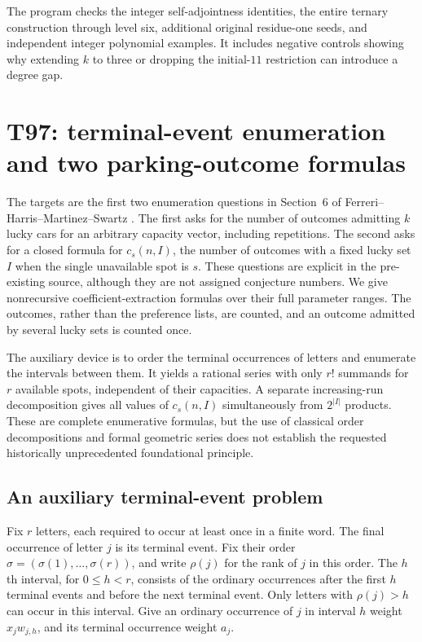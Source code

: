 \documentclass[11pt,a4paper]{article}
\theoremstyle{definition}
\theoremstyle{remark}
\begin{document}
The program  checks the integer self-adjointness
identities, the entire ternary construction through level six, additional
original residue-one seeds, and independent integer polynomial examples.
It includes negative controls showing why extending $k$ to three or
dropping the initial-$11$ restriction can introduce a degree gap.

\clearpage
\section{T97: terminal-event enumeration and two parking-outcome formulas}
\label{sec:t97parking}

The targets are the first two enumeration questions in Section~6 of
Ferreri--Harris--Martinez--Swartz \cite{t97fhms}. The first asks for the
number of outcomes admitting $k$ lucky cars for an arbitrary capacity
vector, including repetitions. The second asks for a closed formula for
$c_s(n,I)$, the number of outcomes with a fixed lucky set $I$ when the
single unavailable spot is $s$. These questions are explicit in the
pre-existing source, although they are not assigned conjecture numbers.
We give nonrecursive coefficient-extraction formulas over their full
parameter ranges. The outcomes, rather than the preference lists, are
counted, and an outcome admitted by several lucky sets is counted once.

The auxiliary device is to order the terminal occurrences of letters
and enumerate the intervals between them. It yields a rational series
with only $r!$ summands for $r$ available spots, independent of their
capacities. A separate increasing-run decomposition gives all values of
$c_s(n,I)$ simultaneously from $2^{|I|}$ products. These are complete
enumerative formulas, but the use of classical order decompositions and
formal geometric series does not establish the requested historically
unprecedented foundational principle.

\subsection{An auxiliary terminal-event problem}

Fix $r$ letters, each required to occur at least once in a finite word.
The final occurrence of letter $j$ is its terminal event. Fix their order
$\sigma=(\sigma(1),\ldots,\sigma(r))$, and write $\rho(j)$ for the rank
of $j$ in this order. The $h$th interval, for $0\le h<r$, consists of the
ordinary occurrences after the first $h$ terminal events and before the
next terminal event. Only letters with $\rho(j)>h$ can occur in this
interval. Give an ordinary occurrence of $j$ in interval $h$ weight
$x_j w_{j,h}$, and its terminal occurrence weight $a_j$.
\end{document}
